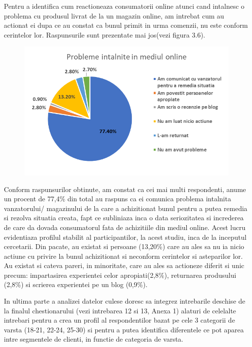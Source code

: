 \documentclass[a4paper, 12pt]{article}
\begin{document}
	\quad Pentru a identifica cum reactioneaza consumatorii  online atunci cand intalnesc o problema cu produsul livrat de la un magazin online, am intrebat cum au actionat ei dupa ce au constat ca bunul primit in urma comenzii, nu este conform cerintelor lor. Raspunsurile sunt prezentate mai jos(vezi figura 3.6).
	
	
	\begin{figure}[!htb]
		\centering
		\includegraphics[width=12cm, height=7cm]{"figures/sapte.png"}
	\end{figure}

	\quad Conform raspunsurilor obtinute, am constat ca cei mai multi respondenti, anume un procent de 77,4\% din total au raspuns ca ei comunica problema intalnita vanzatorului/ magazinului de la care a achizitionat bunul pentru a putea remedia si rezolva situatia creata, fapt ce subliniaza inca o data seriozitatea si increderea de care da dovada consumatorul fata de achizitiile din mediul online. Acest lucru evidentiaza profilul stabilit al participantilor, la acest studiu, inca de la inceputul cercetarii. Din pacate, au existat si persoane (13,20\%) care au ales sa nu ia nicio actiune cu privire la bunul achizitionat si neconform cerintelor si asteparilor lor. Au existat si cateva pareri, in minoritate, care au ales sa actioneze diferit si unic precum: impartasirea experientei celor apropiati(2,8\%), returnarea produsului (2,8\%) si scrierea experientei pe un blog (0,9\%).
	
	\quad In ultima parte a analizei datelor culese doresc sa integrez intrebarile deschise de la finalul chestionarului (vezi intrebarea 12 si 13, Anexa 1) alaturi de celelalte intrebari pentru a crea un profil al respondentilor bazat pe cele 3 categorii de varsta (18-21, 22-24, 25-30) si pentru a putea identifica diferentele ce pot aparea intre segmentele de clienti, in functie de categoria de varsta. 
	
\end{document}
